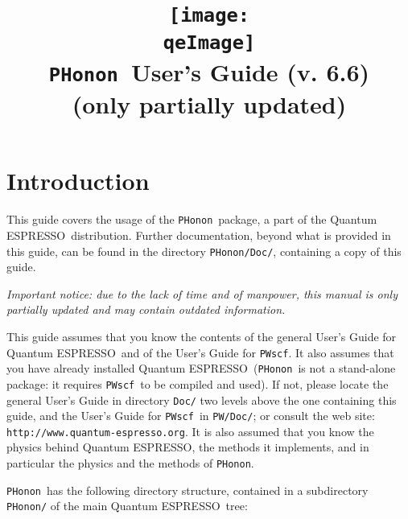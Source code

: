 \documentclass[12pt,a4paper]{article}
\def\version{6.6}
\def\qe{{\sc Quantum ESPRESSO}}
\def\PWscf{\texttt{PWscf}}
\def\PHonon{\texttt{PHonon}}
\begin{document}
 
\author{}
\date{}

\def\qeImage{../../Doc/quantum_espresso}

\title{
  \texttt{[image: \\qeImage]} \\
  \Huge \PHonon\ User's Guide (v. \version)
  \\ \Large (only partially updated)
}

\maketitle

\tableofcontents

\section{Introduction}

This guide covers the usage of the \PHonon\ package, a
part of the \qe\ distribution. 
Further documentation, beyond what is provided 
in this guide, can be found in the directory
\texttt{PHonon/Doc/}, containing a copy of this guide.

{\em Important notice: due to the lack of time and of manpower, this
manual is only partially updated and may contain outdated information.}

This guide assumes that you know the contents of 
the general User's Guide for \qe\ and of the User's 
Guide for \PWscf. It also assumes that you have
already installed \qe\ (\PHonon\ is not a stand-alone
package: it requires \PWscf\ to be compiled and used).
If not, please locate the general User's Guide in directory 
\texttt{Doc/} two levels above the one containing this guide,
and the User's Guide for \PWscf\ in \texttt{PW/Doc/};
or consult the web site:\\
\texttt{http://www.quantum-espresso.org}.
It is also assumed that you know the physics behind \qe,
the methods it implements, and in particular the physics
and the methods of \PHonon.


\PHonon\ has the following directory structure,
contained in a subdirectory \texttt{PHonon/}
of the main \qe\ tree:
\end{document}

